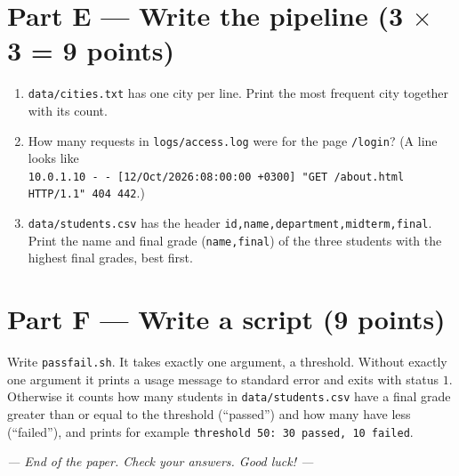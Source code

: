 \section*{Part E --- Write the pipeline \hfill (3 $\times$ 3 = 9 points)}
\begin{enumerate}[leftmargin=1.8em,label=E\arabic*.]
  \item \texttt{data/cities.txt} has one city per line. Print the most frequent city together with its count. \ans{1.1cm}
  \item How many requests in \texttt{logs/access.log} were for the page \texttt{/login}? (A line looks like\\ \texttt{10.0.1.10 - - [12/Oct/2026:08:00:00 +0300] "GET /about.html HTTP/1.1" 404 442}.) \ans{1.1cm}
  \item \texttt{data/students.csv} has the header \texttt{id,name,department,midterm,final}. Print the name and final grade (\texttt{name,final}) of the three students with the highest final grades, best first. \ans{1.1cm}
\end{enumerate}

\section*{Part F --- Write a script \hfill (9 points)}
Write \texttt{passfail.sh}. It takes exactly one argument, a threshold. Without exactly one argument it prints a usage message to standard error and exits with status $1$. Otherwise it counts how many students in \texttt{data/students.csv} have a final grade greater than or equal to the threshold (``passed'') and how many have less (``failed''), and prints for example \texttt{threshold 50: 30 passed, 10 failed}.
\ans{9.0cm}

\begin{center}\itshape --- End of the paper. Check your answers. Good luck! ---\end{center}
